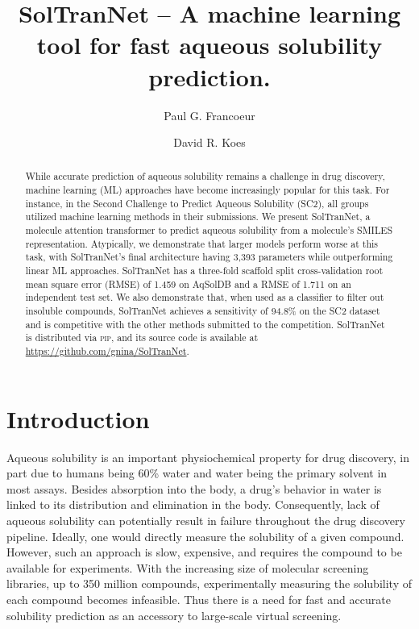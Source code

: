 \documentclass[journal=jmcmar,manuscript=article]{achemso}
\title{SolTranNet -- A machine learning tool for fast aqueous solubility prediction.}
\author{Paul G. Francoeur}
\author{David R. Koes}
\affiliation[Pitt]{Department of Computational and Systems Biology, University of Pittsburgh, Pittsburgh, PA 15260}
\begin{document}
\begin{abstract}
While accurate prediction of aqueous solubility remains a challenge in drug discovery, machine learning (ML) approaches have become increasingly popular for this task.
For instance, in the Second Challenge to Predict Aqueous Solubility (SC2), all groups utilized machine learning methods in their submissions.
We present SolTranNet, a molecule attention transformer to predict aqueous solubility from a molecule's SMILES representation.
Atypically, we demonstrate that larger models perform worse at this task, with SolTranNet's final architecture having 3,393 parameters while outperforming linear ML approaches.
SolTranNet has a three-fold scaffold split cross-validation root mean square error (RMSE) of 1.459 on AqSolDB and a RMSE of 1.711 on an independent test set.
We also demonstrate that, when used as a classifier to filter out insoluble compounds, SolTranNet achieves a sensitivity of 94.8\% on the SC2 dataset and is competitive with the other methods submitted to the competition.
SolTranNet is distributed via \textsc{pip}, and its source code is available at \url{https://github.com/gnina/SolTranNet}.

\end{abstract}


\section{Introduction}
Aqueous solubility is an important physiochemical property for drug discovery, in part due to humans being 60\% water\cite{HumanWater} and water being the primary solvent in most assays. 
Besides absorption into the body, a drug's behavior in water is linked to its distribution and elimination in the body.
Consequently, lack of aqueous solubility can potentially result in failure throughout the drug discovery pipeline.\cite{LIPINSKI1997,DI2006446,EKINS2002305}
Ideally, one would directly measure the solubility of a given compound.
However, such an approach is slow, expensive, and requires the compound to be available for experiments.
With the increasing size of molecular screening libraries, up to 350 million compounds,\cite{NatureVS} experimentally measuring the solubility of each compound becomes infeasible.
Thus there is a need for fast and accurate solubility prediction as an accessory to large-scale virtual screening.
\end{document}
